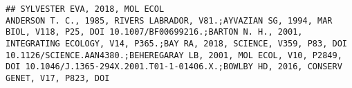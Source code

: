 \documentclass[]{article}
\begin{document}
\begin{verbatim}
## SYLVESTER EVA, 2018, MOL ECOL                                                                                                                                                                                                                                                                                                                                                                                                                                                                                                                                                                                                                                                                                                                                                                                                                                                                                                                                                                                                                                                                                                                                                                                                                                                                                                                                                                                                                                                                                                                                                                                                                                                                                                                                                                                                                                                                                                                                                                                                                                                                                                                                                                                                                                                                                                                                                                                                                                                                                                                                                                                                                                                                                                                                                                                                                                                                                                                                                                                                                                ANDERSON T. C., 1985, RIVERS LABRADOR, V81.;AYVAZIAN SG, 1994, MAR BIOL, V118, P25, DOI 10.1007/BF00699216.;BARTON N. H., 2001, INTEGRATING ECOLOGY, V14, P365.;BAY RA, 2018, SCIENCE, V359, P83, DOI 10.1126/SCIENCE.AAN4380.;BEHEREGARAY LB, 2001, MOL ECOL, V10, P2849, DOI 10.1046/J.1365-294X.2001.T01-1-01406.X.;BOWLBY HD, 2016, CONSERV GENET, V17, P823, DOI 
\end{verbatim}
\end{document}
